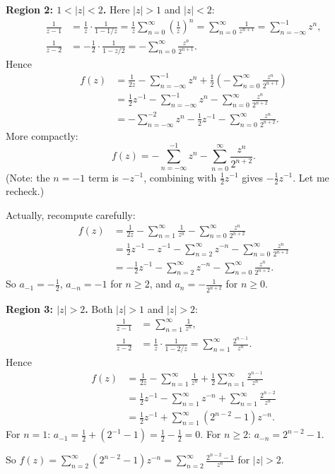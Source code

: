 \documentclass{article}
\begin{document}
\begin{solution}
  \medskip
  \noindent\textbf{Region 2: $1 < |z| < 2$.}
  Here $|z| > 1$ and $|z| < 2$:
  \begin{align*}
    \frac{1}{z-1} &= \frac{1}{z} \cdot \frac{1}{1 - 1/z}
    = \frac{1}{z} \sum_{n=0}^{\infty} \left(\frac{1}{z}\right)^n
    = \sum_{n=0}^{\infty} \frac{1}{z^{n+1}} = \sum_{n=-\infty}^{-1} z^n,\\
    \frac{1}{z-2} &= -\frac{1}{2} \cdot \frac{1}{1 - z/2}
    = -\sum_{n=0}^{\infty} \frac{z^n}{2^{n+1}}.
  \end{align*}
  Hence
  \begin{align*}
    f(z) &= \frac{1}{2z} - \sum_{n=-\infty}^{-1} z^n
    + \frac{1}{2}\left(-\sum_{n=0}^{\infty} \frac{z^n}{2^{n+1}}\right)\\
    &= \frac{1}{2} z^{-1} - \sum_{n=-\infty}^{-1} z^n
    - \sum_{n=0}^{\infty} \frac{z^n}{2^{n+2}}\\
    &= -\sum_{n=-\infty}^{-2} z^n - \frac{1}{2}z^{-1}
    - \sum_{n=0}^{\infty} \frac{z^n}{2^{n+2}}.
  \end{align*}
  More compactly:
  \[
    f(z) = -\sum_{n=-\infty}^{-1} z^n - \sum_{n=0}^{\infty} \frac{z^n}{2^{n+2}}.
  \]
  (Note: the $n=-1$ term is $-z^{-1}$, combining with $\frac{1}{2}z^{-1}$ gives
  $-\frac{1}{2}z^{-1}$. Let me recheck.)

  Actually, recompute carefully:
  \begin{align*}
    f(z) &= \frac{1}{2z} - \sum_{n=1}^{\infty} \frac{1}{z^n}
    - \sum_{n=0}^{\infty} \frac{z^n}{2^{n+2}}\\
    &= \frac{1}{2}z^{-1} - z^{-1} - \sum_{n=2}^{\infty} z^{-n}
    - \sum_{n=0}^{\infty} \frac{z^n}{2^{n+2}}\\
    &= -\frac{1}{2}z^{-1} - \sum_{n=2}^{\infty} z^{-n}
    - \sum_{n=0}^{\infty} \frac{z^n}{2^{n+2}}.
  \end{align*}
  So $a_{-1} = -\frac{1}{2}$, $a_{-n} = -1$ for $n \ge 2$, and
  $a_n = -\frac{1}{2^{n+2}}$ for $n \ge 0$.

  \medskip
  \noindent\textbf{Region 3: $|z| > 2$.}
  Both $|z| > 1$ and $|z| > 2$:
  \begin{align*}
    \frac{1}{z-1} &= \sum_{n=1}^{\infty} \frac{1}{z^n},\\
    \frac{1}{z-2} &= \frac{1}{z} \cdot \frac{1}{1 - 2/z}
    = \sum_{n=1}^{\infty} \frac{2^{n-1}}{z^n}.
  \end{align*}
  Hence
  \begin{align*}
    f(z) &= \frac{1}{2z} - \sum_{n=1}^{\infty} \frac{1}{z^n}
    + \frac{1}{2} \sum_{n=1}^{\infty} \frac{2^{n-1}}{z^n}\\
    &= \frac{1}{2}z^{-1} - \sum_{n=1}^{\infty} z^{-n}
    + \sum_{n=1}^{\infty} \frac{2^{n-2}}{z^n}\\
    &= \frac{1}{2}z^{-1} + \sum_{n=1}^{\infty} (2^{n-2} - 1) z^{-n}.
  \end{align*}
  For $n = 1$: $a_{-1} = \frac{1}{2} + (2^{-1} - 1) = \frac{1}{2} - \frac{1}{2} = 0$.
  For $n \ge 2$: $a_{-n} = 2^{n-2} - 1$.

  So $f(z) = \sum_{n=2}^{\infty} (2^{n-2} - 1) z^{-n} = \sum_{n=2}^{\infty}
  \frac{2^{n-2} - 1}{z^n}$ for $|z| > 2$.
\end{solution}
\end{document}
